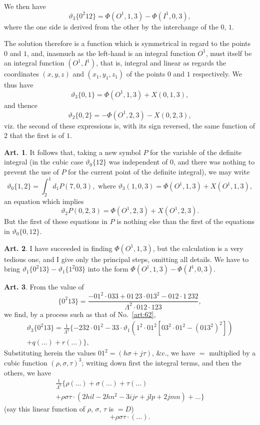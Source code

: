 \documentclass[12pt,a4paper]{article}
\theoremstyle{definition}
\newtheorem{art}{Art.}[section]
\begin{document}
We then have
\[
\vartheta_3\{0^2 12\} = \Phi(O^1, 1, 3) - \Phi(I^1, 0, 3),
\]
where the one side is derived from the other by the interchange of the $0$, $1$.

The solution therefore is a function which is symmetrical in regard to the points $0$ and $1$, and, inasmuch as the left-hand is an integral function $O^1$, must itself be an integral function $(O^1, I^1)$, that is, integral and linear as regards the coordinates $(x, y, z)$ and $(x_1, y_1, z_1)$ of the points $0$ and $1$ respectively. We thus have
\[
\vartheta_3\{0, 1\} = \Phi(O^1, 1, 3) + X(0, 1, 3),
\]
and thence
\[
\vartheta_2\{0, 2\} = -\Phi(O^1, 2, 3) - X(0, 2, 3),
\]
viz. the second of these expressions is, with its sign reversed, the same function of $2$ that the first is of $1$.

\begin{art}\label{art:65}
It follows that, taking a new symbol $P$ for the variable of the definite integral (in the cubic case $\vartheta_0\{12\}$ was independent of $0$, and there was nothing to prevent the use of $P$ for the current point of the definite integral), we may write
\[
\vartheta_0\{1, 2\} = \int_2^1 d_1 P(7, 0, 3), \text{ where } \vartheta_3(1, 0, 3) = \Phi(O^1, 1, 3) + X(O^1, 1, 3),
\]
an equation which implies
\[
\vartheta_2 P(0, 2, 3) = \Phi(O^1, 2, 3) + X(O^1, 2, 3).
\]
But the first of these equations in $P$ is nothing else than the first of the equations in $\vartheta_0\{0, 12\}$.
\end{art}

\begin{art}\label{art:66}
I have succeeded in finding $\Phi(O^1, 1, 3)$, but the calculation is a very tedious one, and I give only the principal steps, omitting all details. We have to bring $\vartheta_1\{0^2 13\} - \vartheta_1\{1^2 03\}$ into the form $\Phi(O^1, 1, 3) - \Phi(I^1, 0, 3)$.
\end{art}

\newpage
\begin{art}\label{art:67}
From the value of
\[
\{0^2 13\} = \frac{-01^2 \cdot 033 + 01\,23 \cdot 013^2 - 012 \cdot 1\,232}{\Lambda^2 \cdot 012 \cdot 123},
\]
we find, by a process such as that of No.~\ref{art:62},
\begin{multline*}
\vartheta_3\{0^2 13\} = \frac{1}{\Lambda^5}\{-\overline{232} \cdot 01^2 - 33 \cdot \vartheta_1(1^2 \cdot 01^2 [03^2 \cdot 01^2 - (013^2)^2]) \\
+ q(\ldots) + r(\ldots)\},
\end{multline*}
Substituting herein the values $01^2 = (h\sigma + j\tau)$, \&c., we have $= $ multiplied by a cubic function $(\rho, \sigma, \tau)^3$; writing down first the integral terms, and then the others, we have
\begin{multline*}
\frac{1}{\Lambda^5}\{\rho(\ldots) + \sigma(\ldots) + \tau(\ldots)\\
+ \rho\sigma\tau \cdot (2hil - 2hn^2 - 3ijr + jlp + 2jmn) + \ldots\}
\end{multline*}
(say this linear function of $\rho$, $\sigma$, $\tau$ is $= D$)
\[
+ \rho\sigma\tau \cdot (\ldots).
\]
\end{art}
\end{document}
